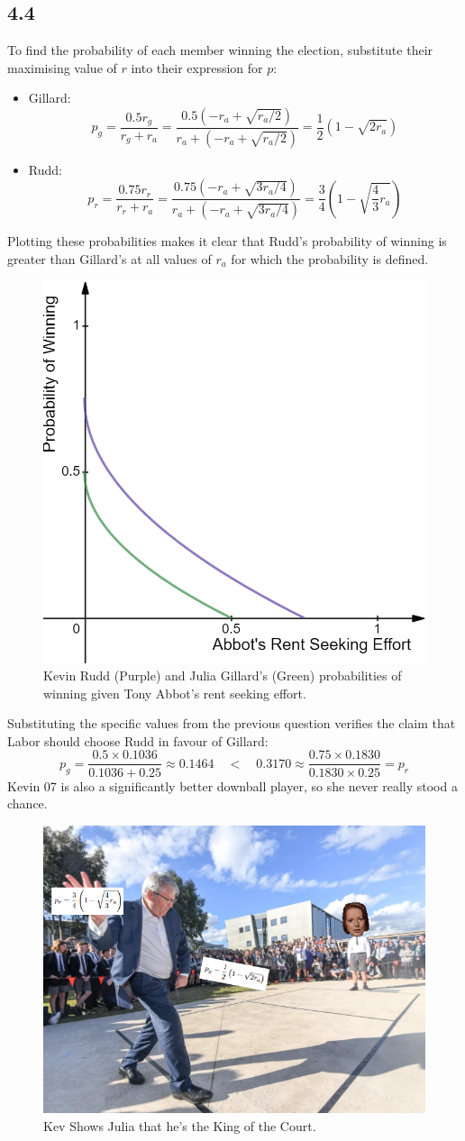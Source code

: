 \documentclass{article}
\begin{document}
\subsection*{4.4}
To find the probability of each member winning the election, substitute their maximising value of $r$ into their expression for $p$:
\begin{itemize}
    \item Gillard: $$p_{g} = \frac{0.5r_{g}}{r_{g} + r_{a}} = \frac{0.5(-r_{a} + \sqrt{{r_{a}}/{2}})}{r_{a} + (-r_{a} + \sqrt{{r_{a}}/{2}})} = \frac{1}{2} \left( 1 - \sqrt{2 r_{a}} \right)$$
    \item Rudd: $$p_{r} = \frac{0.75r_{r}}{r_{r} + r_{a}} = \frac{0.75(-r_{a} + \sqrt{{3r_{a}}/{4}})}{r_{a} + (-r_{a} + \sqrt{{3r_{a}}/{4}})} = \frac{3}{4} \left( 1 - \sqrt{\frac{4}{3} r_{a}} \right)$$
\end{itemize}
Plotting these probabilities makes it clear that Rudd's probability of winning is greater than Gillard's at all values of $r_{a}$ for which the probability is defined.
\begin{figure}[H]
    \centering
    \includegraphics[width=0.6\linewidth]{probabilities.png}
    \caption{Kevin Rudd (Purple) and Julia Gillard's (Green) probabilities of winning given Tony Abbot's rent seeking effort.}
    \label{fig:probabilities}
\end{figure}
Substituting the specific values from the previous question verifies the claim that Labor should choose Rudd in favour of Gillard:
$$p_{g} = \frac{0.5 \times 0.1036}{0.1036 + 0.25} \approx 0.1464 \quad < \quad 0.3170 \approx \frac{0.75 \times 0.1830}{0.1830 \times 0.25} = p_{r}$$
\newpage
\vspace*{\fill}
\centering
Kevin 07 is also a significantly better downball player, so she never really stood a chance.
\begin{figure}[hb]
    \centering
    \includegraphics[width=0.75\linewidth]{handball}
    \caption{Kev Shows Julia that he's the King of the Court.}
    \label{fig:handball}
\end{figure}
\vspace*{\fill}
\end{document}
